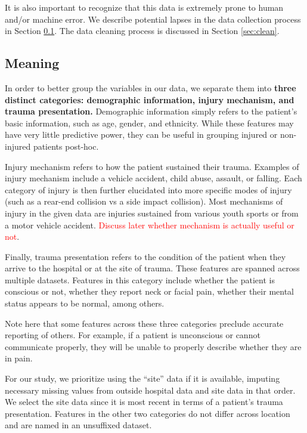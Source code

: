 \documentclass[
]{article}
\begin{document}
It is also important to recognize that this data is extremely prone to
human and/or machine error. We describe potential lapses in the data
collection process in Section \textcolor{blue}{\ref{sec:meaning}}. The
data cleaning process is discussed in Section
\textcolor{blue}{\ref{sec:clean}}.

\hypertarget{sec:meaning}{%
\subsection{Meaning}\label{sec:meaning}}

In order to better group the variables in our data, we separate them
into \textbf{three distinct categories: demographic information, injury
mechanism, and trauma presentation.} Demographic information simply
refers to the patient's basic information, such as age, gender, and
ethnicity. While these features may have very little predictive power,
they can be useful in grouping injured or non-injured patients post-hoc.

Injury mechanism refers to how the patient sustained their trauma.
Examples of injury mechanism include a vehicle accident, child abuse,
assault, or falling. Each category of injury is then further elucidated
into more specific modes of injury (such as a rear-end collision vs a
side impact collision). Most mechanisms of injury in the given data are
injuries sustained from various youth sports or from a motor vehicle
accident.
\textcolor{red}{Discuss later whether mechanism is actually useful or not}.

Finally, trauma presentation refers to the condition of the patient when
they arrive to the hospital or at the site of trauma. These features are
spanned across multiple datasets. Features in this category include
whether the patient is conscious or not, whether they report neck or
facial pain, whether their mental status appears to be normal, among
others.

Note here that some features across these three categories preclude
accurate reporting of others. For example, if a patient is unconscious
or cannot communicate properly, they will be unable to properly describe
whether they are in pain.

For our study, we prioritize using the ``site'' data if it is available,
imputing necessary missing values from outside hospital data and site
data in that order. We select the site data since it is most recent in
terms of a patient's trauma presentation. Features in the other two
categories do not differ across location and are named in an unsuffixed
dataset.
\end{document}
